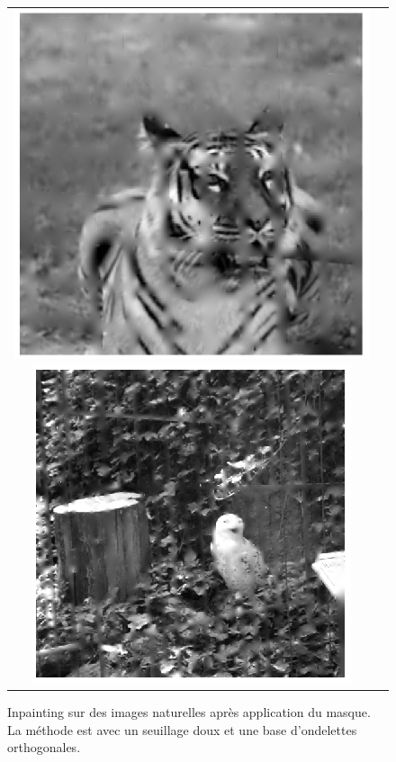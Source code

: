 \begin{figure}
\centering
\begin{tabular}{cc}
\includegraphics[width = .5\columnwidth]{fig/tigre_inpainting.png}
\includegraphics[width = .5\columnwidth]{fig/chouetteinpainting.png}
\end{tabular}
\caption{Inpainting sur des images naturelles après application du masque. La méthode est avec un seuillage doux et une base d'ondelettes orthogonales.}
\end{figure}







